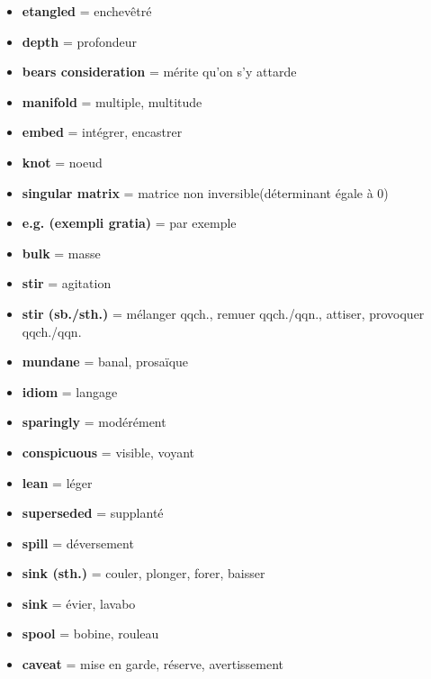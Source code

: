 \documentclass[french]{article}
\begin{document}
\begin{itemize}[label=\textbullet]
	\item \textbf{etangled} = enchevêtré
	\item \textbf{depth} = profondeur
	\item \textbf{bears consideration} = mérite qu'on s'y attarde
	\item \textbf{manifold} = multiple, multitude
	\item \textbf{embed} = intégrer, encastrer
	\item \textbf{knot} = noeud
	\item \textbf{singular matrix} = matrice non inversible(déterminant égale à 0)
	\item \textbf{e.g. (exempli gratia)} = par exemple
	\item \textbf{bulk} = masse
	\item \textbf{stir} = agitation
	\item \textbf{stir (sb./sth.)} = mélanger qqch., remuer qqch./qqn., attiser, provoquer qqch./qqn.
	\item \textbf{mundane} = banal, prosaïque
	\item \textbf{idiom} = langage
	\item \textbf{sparingly} = modérément 
	\item \textbf{conspicuous} = visible, voyant
	\item \textbf{lean} = léger
	\item \textbf{superseded} = supplanté
	\item \textbf{spill} = déversement
	\item \textbf{sink (sth.)} = couler, plonger, forer, baisser
	\item \textbf{sink} = évier, lavabo
	\item \textbf{spool} = bobine, rouleau
	\item \textbf{caveat} = mise en garde, réserve, avertissement
	\\
\end{itemize}
\end{document}

